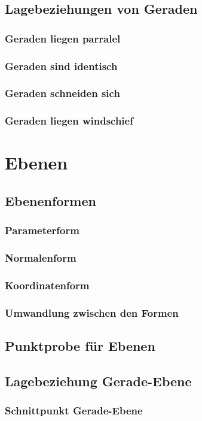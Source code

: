 \subsection{Lagebeziehungen von Geraden}
\subsubsection{Geraden liegen parralel}
\subsubsection{Geraden sind identisch}
\subsubsection{Geraden schneiden sich}
\subsubsection{Geraden liegen windschief}

\section{Ebenen}
\subsection{Ebenenformen}
\subsubsection{Parameterform}
\subsubsection{Normalenform}
\subsubsection{Koordinatenform}
\subsubsection{Umwandlung zwischen den Formen}
\subsection{Punktprobe für Ebenen}
\subsection{Lagebeziehung Gerade-Ebene}
\subsubsection{Schnittpunkt Gerade-Ebene}
